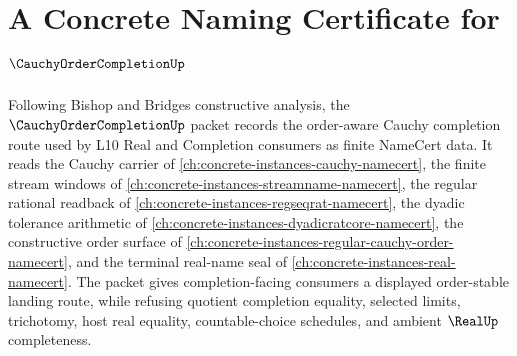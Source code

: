 \chapter{A Concrete Naming Certificate for $\CauchyOrderCompletionUp$}
\label{ch:concrete-instances-cauchy-order-completion-namecert}

Following Bishop and Bridges constructive analysis, the $\CauchyOrderCompletionUp$ packet records the order-aware Cauchy completion route used by L10 Real and Completion consumers as finite NameCert data. It reads the Cauchy carrier of \autoref{ch:concrete-instances-cauchy-namecert}, the finite stream windows of \autoref{ch:concrete-instances-streamname-namecert}, the regular rational readback of \autoref{ch:concrete-instances-regseqrat-namecert}, the dyadic tolerance arithmetic of \autoref{ch:concrete-instances-dyadicratcore-namecert}, the constructive order surface of \autoref{ch:concrete-instances-regular-cauchy-order-namecert}, and the terminal real-name seal of \autoref{ch:concrete-instances-real-namecert}. The packet gives completion-facing consumers a displayed order-stable landing route, while refusing quotient completion equality, selected limits, trichotomy, host real equality, countable-choice schedules, and ambient $\RealUp$ completeness.

